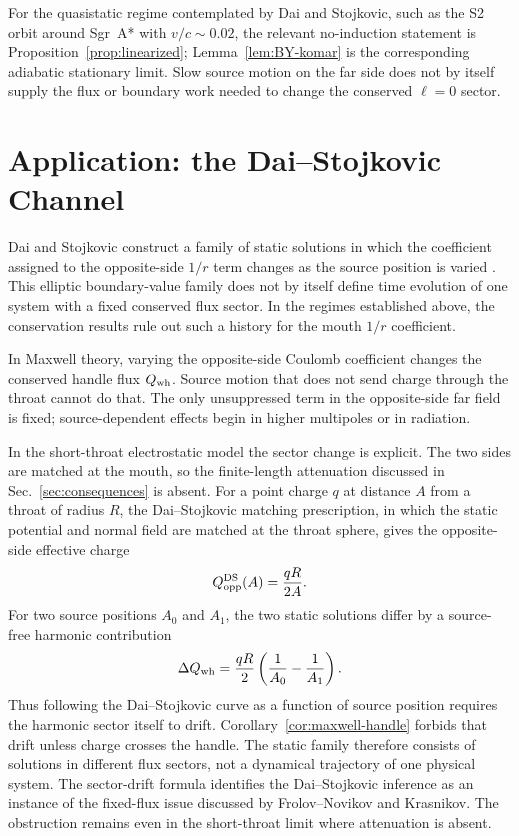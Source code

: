 \documentclass[aps,prd,10pt,onecolumn,nofootinbib,superscriptaddress,floatfix]{revtex4-2}
\begin{document}
For the quasistatic regime contemplated by Dai and Stojkovic, such as the S2
orbit around Sgr~A* with $v/c\sim0.02$, the relevant no-induction statement is
Proposition~\ref{prop:linearized}; Lemma~\ref{lem:BY-komar} is the corresponding
adiabatic stationary limit.  Slow source motion on the far side does not by
itself supply the flux or boundary work needed to change the conserved
$\ell=0$ sector.

\section{Application: the Dai--Stojkovic Channel}
\label{sec:ds}

Dai and Stojkovic construct a family of static solutions in which the
coefficient assigned to the opposite-side $1/r$ term changes as the source
position is varied \cite{DaiStojkovic2019Observing}.  This elliptic
boundary-value family does not by itself define time evolution of one system
with a fixed conserved flux sector.  In the regimes established above, the
conservation results rule out such a history for the mouth $1/r$ coefficient.

In Maxwell theory, varying the opposite-side Coulomb coefficient changes the
conserved handle flux $Q_{\rm wh}$.  Source motion that does not send charge
through the throat cannot do that.  The only unsuppressed term in the
opposite-side far field is fixed; source-dependent effects begin in
higher multipoles or in radiation.

In the short-throat electrostatic model the sector change is explicit.  The two
sides are matched at the mouth, so the finite-length attenuation discussed in
Sec.~\ref{sec:consequences} is absent.  For a point charge $q$ at distance $A$
from a throat of radius $R$, the Dai--Stojkovic matching prescription, in
which the static potential and normal field are matched at the throat sphere,
gives the opposite-side effective charge
\begin{equation}
  Q_{\rm opp}^{\rm DS}(A)=\frac{qR}{2A}.
\end{equation}
For two source positions $A_0$ and $A_1$, the two static solutions differ by a
source-free harmonic contribution
\begin{equation}
  \Delta Q_{\rm wh}
  =
  \frac{qR}{2}\left(\frac{1}{A_0}-\frac{1}{A_1}\right).
\end{equation}
Thus following the Dai--Stojkovic curve as a function of source position
requires the harmonic sector itself to drift.
Corollary~\ref{cor:maxwell-handle} forbids that drift unless charge crosses the
handle.  The static family therefore consists of solutions in different flux
sectors, not a dynamical trajectory of one physical system.  The sector-drift
formula identifies the Dai--Stojkovic inference as an instance of the
fixed-flux issue discussed by Frolov--Novikov and Krasnikov.  The obstruction
remains even in the short-throat limit where attenuation is absent.
\end{document}
